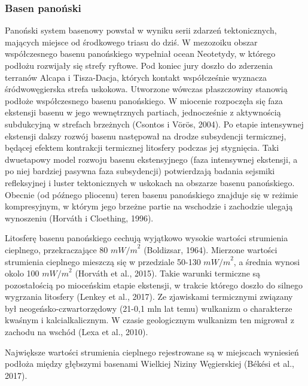 \documentclass[11.5pt,twoside]{report}
\begin{document}
\subsubsection{Basen panoński}

Panoński system basenowy powstał w wyniku serii zdarzeń tektonicznych, mających miejsce od środkowego triasu do dziś. W mezozoiku obszar współczesnego basenu panońskiego wypełniał ocean Neotetydy, w którego podłożu rozwijały się strefy ryftowe. Pod koniec jury doszło do zderzenia terranów Alcapa i Tisza-Dacja, których kontakt współcześnie wyznacza śródwowęgierska strefa uskokowa. Utworzone wówczas płaszczowiny stanowią podłoże współczesnego basenu panońskiego. W miocenie rozpoczęła się faza ekstensji basenu w jego wewnętrznych partiach, jednocześnie z aktywnością subdukcyjną w strefach brzeżnych (Csontos i V\"{o}r\"{o}s, 2004). Po etapie intensywnej ekstensji dalszy rozwój basenu następował na drodze subsydencji termicznej, będącej efektem kontrakcji termicznej litosfery podczas jej stygnięcia. Taki dwuetapowy model rozwoju basenu ekstensyjnego (faza intensywnej ekstensji, a po niej bardziej pasywna faza subsydencji) potwierdzają badania sejsmiki refleksyjnej i luster tektonicznych w uskokach na obszarze basenu panońskiego. Obecnie (od pó\'{z}nego pliocenu) teren basenu panońskiego znajduje się w reżimie kompresyjnym, w którym jego brzeżne partie na wschodzie i zachodzie ulegają wynoszeniu (Horv\'{a}th i Cloething, 1996). 

Litosferę basenu panońskiego cechują wyjątkowo wysokie wartości strumienia cieplnego, przekraczające 80 ${mW/m}^{2}$ (Boldizsar, 1964). Mierzone wartości strumienia cieplnego mieszczą się w przedziale 50-130 ${mW/m}^{2}$, a średnia wynosi okolo 100 ${mW/m}^{2}$ (Horv\'{a}th et al., 2015). Takie warunki termiczne są pozostałością po mioceńskim etapie ekstensji, w trakcie którego doszło do silnego wygrzania litosfery (Lenkey et al., 2017). Ze zjawiskami termicznymi związany był neogeńsko-czwartorzędowy (21-0,1 mln lat temu) wulkanizm o charakterze kwaśnym i kalcialkalicznym. W czasie geologicznym wulkanizm ten migrował z zachodu na wschód (Lexa et al., 2010). 

Największe wartości strumienia cieplnego rejestrowane są w miejscach wyniesień podłoża między głębszymi basenami Wielkiej Niziny Węgierskiej (B\'{e}k\'{e}si et al., 2017). 
\end{document}
